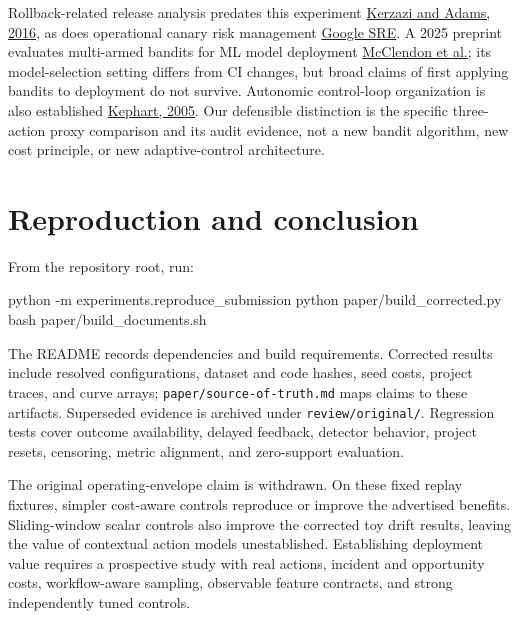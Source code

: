 \documentclass[
  10pt,
]{article}
\newenvironment{Shaded}{}{}
\newcommand{\NormalTok}[1]{#1}
\begin{document}
Rollback-related release analysis predates this experiment
\href{https://mcis.cs.queensu.ca/publications/2016/saner_noureddine.pdf}{Kerzazi
and Adams, 2016}, as does operational canary risk management
\href{https://sre.google/workbook/canarying-releases/}{Google SRE}. A
2025 preprint evaluates multi-armed bandits for ML model deployment
\href{https://arxiv.org/abs/2503.22595}{McClendon et al.}; its
model-selection setting differs from CI changes, but broad claims of
first applying bandits to deployment do not survive. Autonomic
control-loop organization is also established
\href{https://dominoweb.draco.res.ibm.com/reports/rc23692.pdf}{Kephart,
2005}. Our defensible distinction is the specific three-action proxy
comparison and its audit evidence, not a new bandit algorithm, new cost
principle, or new adaptive-control architecture.

\section{Reproduction and conclusion}\label{reproduction-and-conclusion}

From the repository root, run:

\begin{Shaded}
\begin{Highlighting}[]
\NormalTok{python {-}m experiments.reproduce\_submission}
\NormalTok{python paper/build\_corrected.py}
\NormalTok{bash paper/build\_documents.sh}
\end{Highlighting}
\end{Shaded}

The README records dependencies and build requirements. Corrected
results include resolved configurations, dataset and code hashes, seed
costs, project traces, and curve arrays;
\texttt{paper/source-of-truth.md} maps claims to these artifacts.
Superseded evidence is archived under \texttt{review/original/}.
Regression tests cover outcome availability, delayed feedback, detector
behavior, project resets, censoring, metric alignment, and zero-support
evaluation.

The original operating-envelope claim is withdrawn. On these fixed
replay fixtures, simpler cost-aware controls reproduce or improve the
advertised benefits. Sliding-window scalar controls also improve the
corrected toy drift results, leaving the value of contextual action
models unestablished. Establishing deployment value requires a
prospective study with real actions, incident and opportunity costs,
workflow-aware sampling, observable feature contracts, and strong
independently tuned controls.
\end{document}
